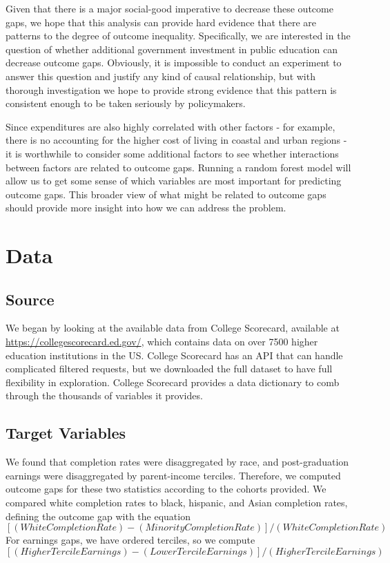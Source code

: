 \documentclass{article}
\begin{document}
Given that there is a major social-good imperative to decrease these outcome gaps, we hope that this analysis can provide hard evidence that there are patterns to the degree of outcome inequality. Specifically, we are interested in the question of whether additional government investment in public education can decrease outcome gaps. Obviously, it is impossible to conduct an experiment to answer this question and justify any kind of causal relationship, but with thorough investigation we hope to provide strong evidence that this pattern is consistent enough to be taken seriously by policymakers.

Since expenditures are also highly correlated with other factors - for example, there is no accounting for the higher cost of living in coastal and urban regions - it is worthwhile to consider some additional factors to see whether interactions between factors are related to outcome gaps. Running a random forest model will allow us to get some sense of which variables are most important for predicting outcome gaps. This broader view of what might be related to outcome gaps should provide more insight into how we can address the problem.




\section{Data}

\subsection{Source}

We began by looking at the available data from College Scorecard, available at \url{https://collegescorecard.ed.gov/}, which contains data on over 7500 higher education institutions in the US. College Scorecard has an API that can handle complicated filtered requests, but we downloaded the full dataset to have full flexibility in exploration. College Scorecard provides a data dictionary to comb through the thousands of variables it provides.

\subsection{Target Variables}

We found that completion rates were disaggregated by race, and post-graduation earnings were disaggregated by parent-income terciles. Therefore, we computed outcome gaps for these two statistics according to the cohorts provided. We compared white completion rates to black, hispanic, and Asian completion rates, defining the outcome gap with the equation 
$$[(White Completion Rate) - (Minority Completion Rate)]/ (White Completion Rate)$$
For earnings gaps, we have ordered terciles, so we compute
$$[(Higher Tercile Earnings) - (Lower Tercile Earnings)]/ (Higher Tercile Earnings)$$
\end{document}
